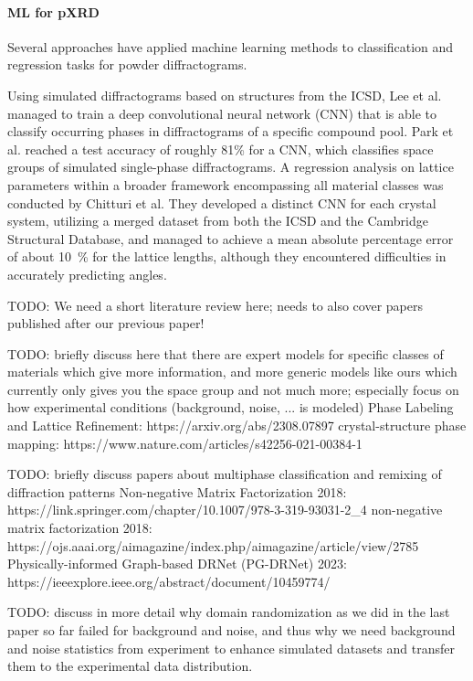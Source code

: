 \paragraph{ML for pXRD} Several approaches have applied machine learning methods to classification and regression tasks for powder diffractograms.

Using simulated diffractograms based on structures from the ICSD, Lee et al. managed to train a deep convolutional neural network (CNN) that is able to classify occurring phases in diffractograms of a specific compound pool. \cite{Lee2020}
Park et al. reached a test accuracy of roughly 81\% for a CNN, which classifies space groups of simulated single-phase diffractograms. \cite{Park2017}
A regression analysis on lattice parameters within a broader framework encompassing all material classes was conducted by Chitturi et al.\cite{Chitturi2021} They developed a distinct CNN for each crystal system, utilizing a merged dataset from both the ICSD and the Cambridge Structural Database, and managed to achieve a mean absolute percentage error of about \SI{10}{\percent} for the lattice lengths, although they encountered difficulties in accurately predicting angles.

TODO: We need a short literature review here; needs to also cover papers published after our previous paper!

TODO: briefly discuss here that there are expert models for specific classes of materials which give more information, and more generic models like ours which currently only gives you the space group and not much more; especially focus on how experimental conditions (background, noise, ... is modeled)
Phase Labeling and Lattice Refinement: https://arxiv.org/abs/2308.07897
crystal-structure phase mapping: https://www.nature.com/articles/s42256-021-00384-1


TODO: briefly discuss papers about multiphase classification and remixing of diffraction patterns
Non-negative Matrix Factorization 2018: https://link.springer.com/chapter/10.1007/978-3-319-93031-2_4
non-negative matrix factorization 2018: https://ojs.aaai.org/aimagazine/index.php/aimagazine/article/view/2785
Physically-informed Graph-based DRNet (PG-DRNet) 2023: https://ieeexplore.ieee.org/abstract/document/10459774/

TODO: discuss in more detail why domain randomization as we did in the last paper so far failed for background and noise, and thus why we need background and noise statistics from experiment to enhance simulated datasets and transfer them to the experimental data distribution.